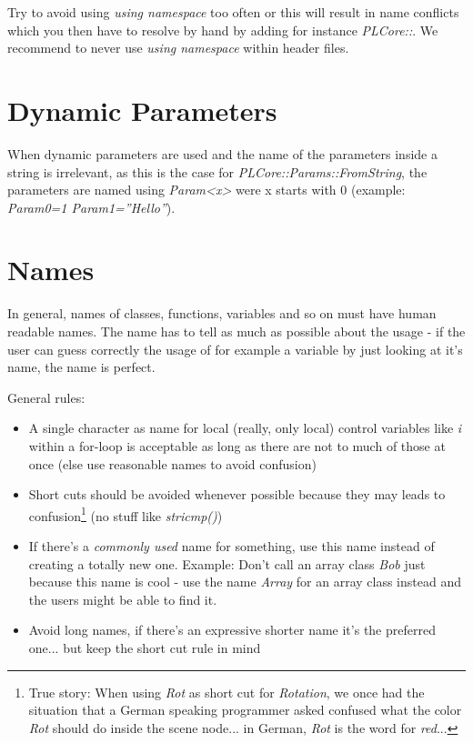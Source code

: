 Try to avoid using \emph{using namespace} too often or this will result in name conflicts which you then have to resolve by hand by adding for instance \emph{PLCore::}. We recommend to never use \emph{using namespace} within header files.




\section{Dynamic Parameters}
When dynamic parameters are used and the name of the parameters inside a string is irrelevant, as this is the case for \emph{PLCore::Params::FromString}, the parameters are named using \emph{Param<x>} were x starts with $0$ (example: \emph{Param0=1 Param1=''Hello''}).  




\section{Names}
In general, names of classes, functions, variables and so on must have human readable names. The name has to tell as much as possible about the usage - if the user can guess correctly the usage of for example a variable by just looking at it's name, the name is perfect.

General rules:

\begin{itemize}
\item A single character as name for local (really, only local) control variables like \emph{i} within a for-loop is acceptable as long as there are not to much of those at once (else use reasonable names to avoid confusion)
\item Short cuts should be avoided whenever possible because they may leads to confusion\footnote{True story: When using \emph{Rot} as short cut for \emph{Rotation}, we once had the situation that a German speaking programmer asked confused what the color \emph{Rot} should do inside the scene node... in German, \emph{Rot} is the word for \emph{red}...} (no stuff like \emph{stricmp()})
\item If there's a \emph{commonly used} name for something, use this name instead of creating a totally new one. Example: Don't call an array class \emph{Bob} just because this name is cool - use the name \emph{Array} for an array class instead and the users might be able to find it.
\item Avoid long names, if there's an expressive shorter name it's the preferred one... but keep the short cut rule in mind
\end{itemize}

